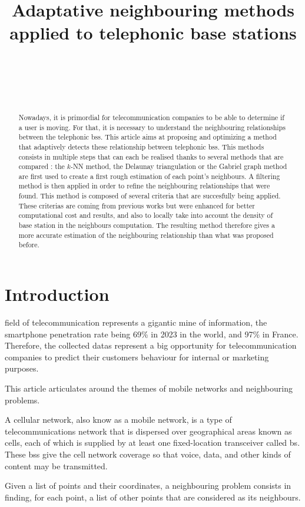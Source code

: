\documentclass[lettersize,journal,english]{IEEEtran}
\title{Adaptative neighbouring methods applied to telephonic base stations}
\author{\IEEEauthorblockN{Paul MÉHAUD}\\
\IEEEauthorblockA{\textit{Intern at CTU in Prague} \\
\textit{INSA Rouen Normandie}\\
paul.mehaud@insa-rouen.fr}\\
\and
\IEEEauthorblockN{Brendan SÉVELLEC}\\
\IEEEauthorblockA{\textit{Intern at CTU in Prague} \\
\textit{INSA Rouen Normandie}\\
brendan.sevellec@insa-rouen.fr}}
\begin{document}
\maketitle

\begin{abstract}
    Nowadays, it is primordial for telecommunication companies to be able to determine if a user is moving. For that, it is necessary to understand the neighbouring relationships between the telephonic \acrlong{bs}s. This article aims at proposing and optimizing a method that adaptively detects these relationship between telephonic \acrlong{bs}s. This methods consists in multiple steps that can each be realised thanks to several methods that are compared : the $k$-NN method, the Delaunay triangulation or the Gabriel graph method are first used to create a first rough estimation of each point's neighbours. A filtering method is then applied in order to refine the neighbouring relationships that were found. This method is composed of several criteria that are succesfully being applied. These criterias are coming from previous works but were enhanced for better computational cost and results, and also to locally take into account the density of base station in the neighbours computation. The resulting method therefore gives a more accurate estimation of the neighbouring relationship than what was proposed before.
\end{abstract}
\section{Introduction}
     field of telecommunication represents a gigantic mine of information, the smartphone penetration rate being 69\% in 2023 in the world, and 97\% in France. Therefore, the collected datas represent a big opportunity for telecommunication companies to predict their customers behaviour for internal or marketing purposes. 
    
    This article articulates around the themes of mobile networks and neighbouring problems. 

    A cellular network, also know as a mobile network, is a type of telecommunications network that is dispersed over geographical areas known as cells, each of which is supplied by at least one fixed-location transceiver called \acrfull{bs}. These \acrshort{bs}s give the cell network coverage so that voice, data, and other kinds of content may be transmitted.
    
    Given a list of points and their coordinates, a neighbouring problem consists in finding, for each point, a list of other points that are considered as its neighbours.
\end{document}
